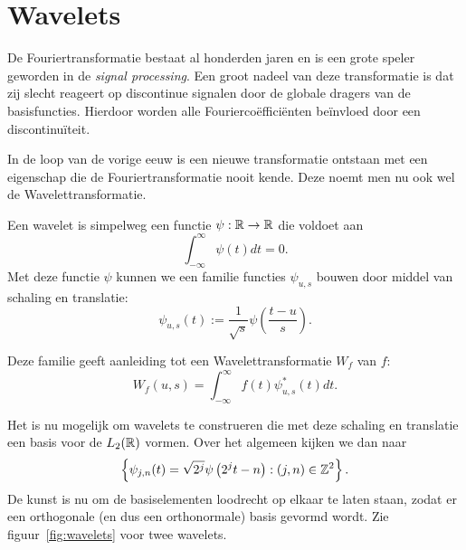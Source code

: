 \chapter{Wavelets}
De Fouriertransformatie bestaat al honderden jaren en is een grote speler geworden in de \emph{signal processing}. Een groot nadeel van deze transformatie is dat zij slecht reageert op discontinue signalen door de globale dragers van de basisfuncties. Hierdoor worden alle Fourierco\"effici\"enten be\"invloed door een discontinu\"iteit.

In de loop van de vorige eeuw is een nieuwe transformatie ontstaan met een eigenschap die de Fouriertransformatie nooit kende. Deze noemt men nu ook wel de Wavelettransformatie.

\begin{definitie}
  Een wavelet is simpelweg een functie $\psi: \mathbb{R} \to \mathbb{R}$ die voldoet aan
  \[
  \int_{-\infty}^{\infty} \psi(t) dt = 0.
  \]
  Met deze functie $\psi$ kunnen we een familie functies $\psi_{u,s}$ bouwen door middel van schaling en translatie:
  \[
  \psi_{u,s}(t) := \frac{1}{\sqrt{s}} \psi\left(\frac{t-u}{s}\right).
  \]
\end{definitie}

Deze familie geeft aanleiding tot een Wavelettransformatie $W_f$ van $f$:
\[
W_f(u,s) = \int_{-\infty}^\infty f(t) \psi^*_{u,s}(t) dt.
\]

Het is nu mogelijk om wavelets te construeren die met deze schaling en translatie een basis voor de $L_2(\mathbb{R})$ vormen. Over het algemeen kijken we dan naar
\[
\left\{ \psi_{j,n}(t) = \sqrt{2^j} \psi\left( 2^j t - n\right) : (j,n) \in \mathbb{Z}^2 \right\}.
\]
De kunst is nu om de basiselementen loodrecht op elkaar te laten staan, zodat er een orthogonale (en dus een orthonormale) basis gevormd wordt. Zie figuur~\ref{fig:wavelets} voor twee wavelets.

